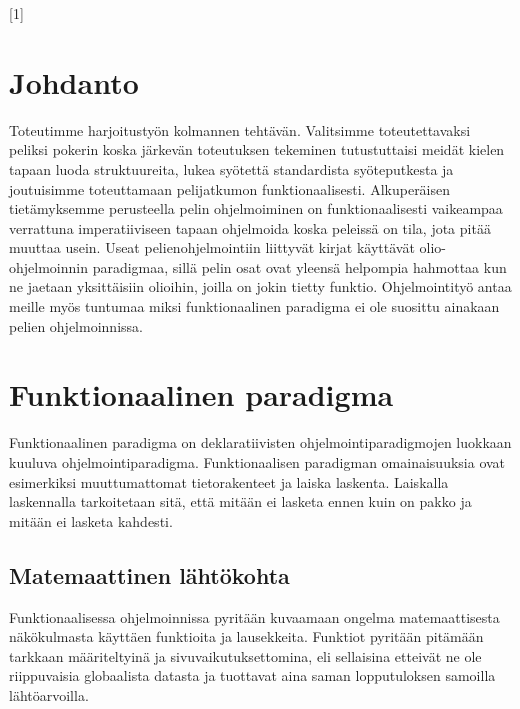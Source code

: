 \documentclass[12pt]{article}
\begin{document}
[1]
{}
{}
% 

\maketitle
\section{Johdanto}
Toteutimme harjoitustyön kolmannen tehtävän.
Valitsimme toteutettavaksi peliksi pokerin koska järkevän toteutuksen tekeminen tutustuttaisi meidät kielen tapaan luoda struktuureita,
lukea syötettä standardista syöteputkesta ja joutuisimme toteuttamaan pelijatkumon funktionaalisesti. Alkuperäisen tietämyksemme perusteella pelin ohjelmoiminen on funktionaalisesti vaikeampaa verrattuna imperatiiviseen tapaan ohjelmoida koska peleissä on tila, jota pitää muuttaa usein. Useat pelienohjelmointiin liittyvät kirjat käyttävät olio-ohjelmoinnin paradigmaa, sillä pelin osat ovat yleensä helpompia hahmottaa kun ne jaetaan yksittäisiin olioihin, joilla on jokin tietty funktio. Ohjelmointityö antaa meille myös tuntumaa miksi funktionaalinen paradigma ei ole suosittu ainakaan pelien ohjelmoinnissa.

\section{Funktionaalinen paradigma}
Funktionaalinen paradigma on deklaratiivisten ohjelmointiparadigmojen luokkaan kuuluva ohjelmointiparadigma. Funktionaalisen paradigman omainaisuuksia ovat esimerkiksi muuttumattomat tietorakenteet ja laiska laskenta. Laiskalla laskennalla tarkoitetaan sitä, että mitään ei lasketa ennen kuin on pakko ja mitään ei lasketa kahdesti.

\subsection{Matemaattinen lähtökohta}
Funktionaalisessa ohjelmoinnissa pyritään kuvaamaan ongelma matemaattisesta näkökulmasta käyttäen funktioita ja lausekkeita. Funktiot pyritään pitämään tarkkaan määriteltyinä ja sivuvaikutuksettomina, eli sellaisina etteivät ne ole riippuvaisia globaalista datasta ja tuottavat aina saman lopputuloksen samoilla lähtöarvoilla.
\end{document}
